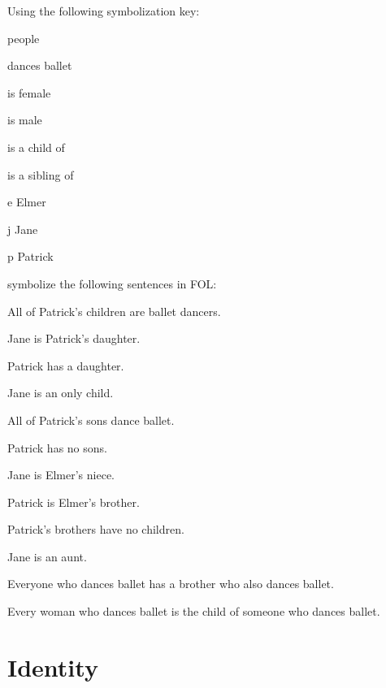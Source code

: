 \solutions
\problempart
\label{pr.FOLballet}
Using the following symbolization key:
\begin{ekey}
\item[\text{domain}] people
\item[\atom{D}{x}]  dances ballet
\item[\atom{F}{x}]  is female
\item[\atom{M}{x}]  is male
\item[\atom{C}{x,y}]  is a child of 
\item[\atom{S}{x,y}]  is a sibling of 
\item[e] Elmer
\item[j] Jane
\item[p] Patrick
\end{ekey}
symbolize the following sentences in FOL:
\begin{earg}
\item All of Patrick's children are ballet dancers.
\item Jane is Patrick's daughter.
\item Patrick has a daughter.
\item Jane is an only child.
\item All of Patrick's sons dance ballet.
\item Patrick has no sons.
\item Jane is Elmer's niece.
\item Patrick is Elmer's brother.
\item Patrick's brothers have no children.
\item Jane is an aunt.
\item Everyone who dances ballet has a brother who also dances ballet.
\item Every woman who dances ballet is the child of someone who dances ballet.
\end{earg}


\chapter{Identity}
\label{sec.identity}

